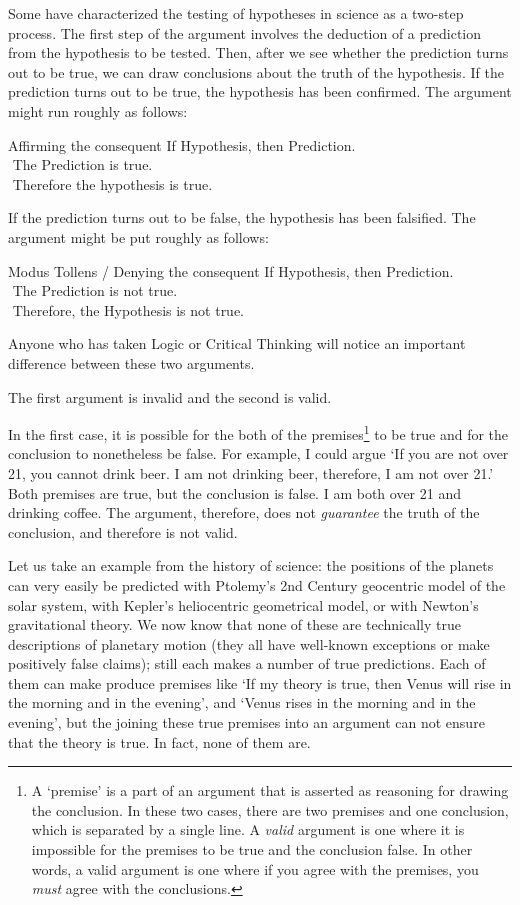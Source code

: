 \begin{refsection}
Some have characterized the testing of hypotheses in science as a two-step process. The first step of the argument involves the deduction of a prediction from the hypothesis to be tested. Then, after we see whether the prediction turns out to be true, we can draw conclusions about the truth of the hypothesis. If the prediction turns out to be true, the hypothesis has been confirmed. The argument might run roughly as follows:
\begin{apatextbox}{Affirming the consequent}
If Hypothesis, then Prediction.\\ The Prediction is true. \\ \hline Therefore the hypothesis is true.
\end{apatextbox}
If the prediction turns out to be false, the hypothesis has been falsified. The argument might be put roughly as follows:
\begin{apatextbox}{Modus Tollens / Denying the consequent}
If Hypothesis, then Prediction.\\ The Prediction is not true.\\ \hline Therefore, the Hypothesis is not true.
\end{apatextbox}
Anyone who has taken Logic or Critical Thinking will notice an important difference between these two arguments. 

The first argument is invalid and the second is valid. 

In the first case, it is possible for the both of the premises\footnote{A ‘premise’ is a part of an argument that is asserted as reasoning for drawing the conclusion. In these two cases, there are two premises and one conclusion, which is separated by a single line. A \emph{valid} argument is one where it is impossible for the premises to be true and the conclusion false. In other words, a valid argument is one where if you agree with the premises, you \emph{must} agree with the conclusions.} to be true and for the conclusion to nonetheless be false. For example, I could argue `If you are not over 21, you cannot drink beer. I am not drinking beer, therefore, I am not over 21.' Both premises are true, but the conclusion is false. I am both over 21 and drinking coffee. The argument, therefore, does not \emph{guarantee} the truth of the conclusion, and therefore is not valid.

Let us take an example from the history of science: the positions of the planets can very easily be predicted with Ptolemy's 2nd Century geocentric model of the solar system, with Kepler's heliocentric geometrical model, or with Newton's gravitational theory. We now know that none of these are technically true descriptions of planetary motion (they all have well-known exceptions or make positively false claims); still each makes a number of true predictions. Each of them can make produce premises like `If my theory is true, then Venus will rise in the morning and in the evening', and `Venus rises in the morning and in the evening', but the joining these true premises into an argument can not ensure that the theory is true. In fact, none of them are.


\end{refsection}
